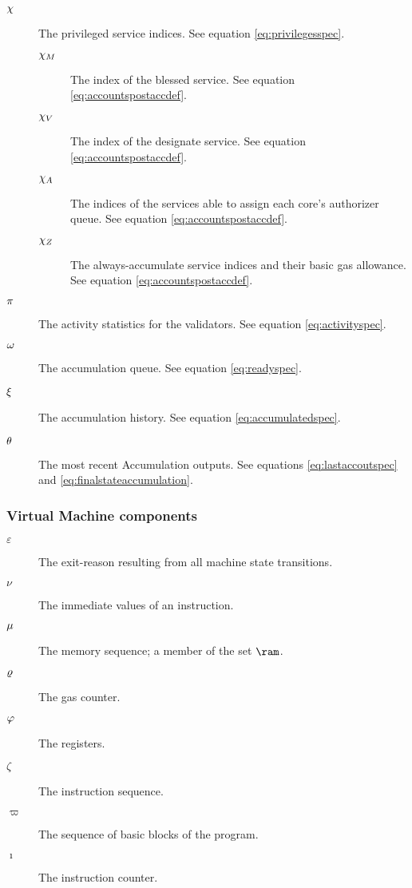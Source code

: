 \begin{description}
  \item[$\chi$] The privileged service indices. See equation \ref{eq:privilegesspec}.
  \begin{description}
    \item[$\chi_M$] The index of the blessed service. See equation \ref{eq:accountspostaccdef}.
    \item[$\chi_V$] The index of the designate service. See equation \ref{eq:accountspostaccdef}.
    \item[$\chi_A$] The indices of the services able to assign each core's authorizer queue. See equation \ref{eq:accountspostaccdef}.
    \item[$\chi_Z$] The always-accumulate service indices and their basic gas allowance. See equation \ref{eq:accountspostaccdef}.
  \end{description}
  \item[$\pi$] The activity statistics for the validators. See equation \ref{eq:activityspec}.
  \item[$\omega$] The accumulation queue. See equation \ref{eq:readyspec}.
  \item[$\xi$] The accumulation history. See equation \ref{eq:accumulatedspec}.
  \item[$\theta$] The most recent Accumulation outputs. See equations \ref{eq:lastaccoutspec} and \ref{eq:finalstateaccumulation}.
\end{description}

\subsubsection{Virtual Machine components}

\begin{description}
  \item[$\varepsilon$] The exit-reason resulting from all machine state transitions.
  \item[$\nu$] The immediate values of an instruction.
  \item[$\mu$] The memory sequence; a member of the set $\ram$.
  \item[$\varrho$] The gas counter.
  \item[$\varphi$] The registers.
  \item[$\zeta$] The instruction sequence.
  \item[$\varpi$] The sequence of basic blocks of the program.
  \item[$\imath$] The instruction counter.
\end{description}

